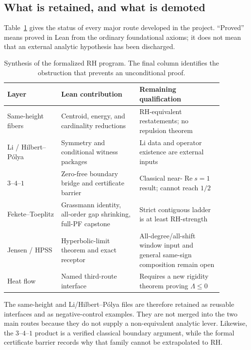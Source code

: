 \documentclass[11pt,a4paper]{article}
\theoremstyle{definition}
\begin{document}
\subsection{What is retained, and what is demoted}

Table~\ref{tab:program-synthesis} gives the status of every major route
developed in the project.  ``Proved'' means proved in Lean from the ordinary
foundational axioms; it does not mean that an external analytic hypothesis has
been discharged.

\begin{table}[H]
\centering
\small
\caption{Synthesis of the formalized RH program.  The final column identifies
the obstruction that prevents an unconditional proof.}
\label{tab:program-synthesis}
\begin{tabular}{p{0.22\linewidth}p{0.32\linewidth}p{0.34\linewidth}}
\toprule
\textbf{Layer} & \textbf{Lean contribution} & \textbf{Remaining qualification}\\
\midrule
Same-height fibers & Centroid, energy, and cardinality reductions & RH-equivalent restatements; no repulsion theorem\\
Li / Hilbert--P\'olya & Symmetry and conditional witness packages & Li data and operator existence are external inputs\\
$3$--$4$--$1$ & Zero-free boundary bridge and certificate barrier & Classical near-$\operatorname{Re}s=1$ result; cannot reach $1/2$\\
Fekete--Toeplitz & Grassmann identity, all-order gap shrinking, full-PF capstone & Strict contiguous ladder is at least RH-strength\\
Jensen / HPSS & Hyperbolic-limit theorem and exact receptor & All-degree/all-shift window input and general same-sign composition remain open\\
Heat flow & Named third-route interface & Requires a new rigidity theorem proving $\Lambda\le0$\\
\bottomrule
\end{tabular}
\end{table}

The same-height and Li/Hilbert--P\'olya files are therefore retained as
reusable interfaces and as negative-control examples.  They are not merged
into the two main routes because they do not supply a non-equivalent analytic
lever.  Likewise, the $3$--$4$--$1$ product is a verified classical boundary
argument, while the formal certificate barrier records why that family cannot
be extrapolated to RH.
\end{document}
